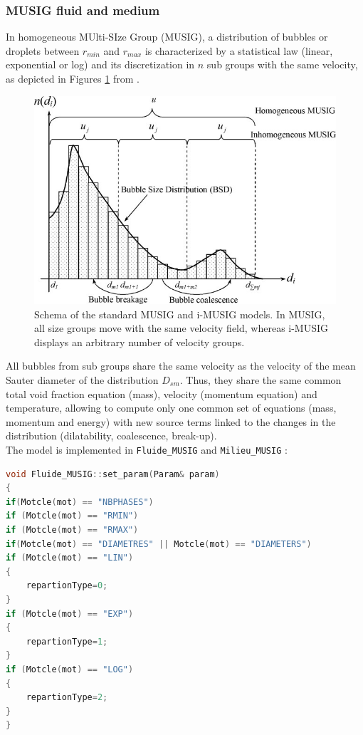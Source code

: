 \subsubsection{MUSIG fluid and medium}
In homogeneous MUlti-SIze Group (MUSIG), a distribution of bubbles or droplets between $r_{min}$ and $r_{max}$ is characterized by a statistical law (linear, exponential or log) and its discretization in $n$ sub groups with the same velocity, as depicted in Figures \ref{msgdis} from \textcite{cheung}.
\begin{figure}[!ht]
    \centering
    \includegraphics[scale =0.8]{Figure/musigdistri.jpg}
    \caption{Schema of the standard MUSIG and i-MUSIG models. In MUSIG, all size groups move with the same velocity field, whereas i-MUSIG displays an arbitrary number of velocity groups.}
    \label{msgdis}
\end{figure}
All bubbles from sub groups share the same velocity as the velocity of the mean Sauter diameter of the distribution $D_{sm}$. Thus, they share the same common total void fraction equation (mass), velocity (momentum equation) and temperature, allowing to compute only one common set of equations (mass, momentum and energy) with new source terms linked to the changes in the distribution (dilatability, coalescence, break-up).\\
The model is implemented in \texttt{Fluide\_MUSIG} and \texttt{Milieu\_MUSIG} :
\begin{lstlisting}[language=c++]
void Fluide_MUSIG::set_param(Param& param)
{
if(Motcle(mot) == "NBPHASES")
if (Motcle(mot) == "RMIN")
if (Motcle(mot) == "RMAX")
if(Motcle(mot) == "DIAMETRES" || Motcle(mot) == "DIAMETERS")
if (Motcle(mot) == "LIN")
{
    repartionType=0;
}
if (Motcle(mot) == "EXP")
{
    repartionType=1;
}
if (Motcle(mot) == "LOG")
{
    repartionType=2;
}
}
\end{lstlisting}
